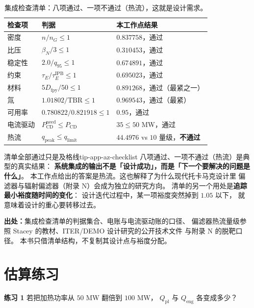 \begin{table}[htbp]
\centering
\small
\setlength{\tabcolsep}{4pt}
\caption{集成检查清单：八项通过、一项不通过（热流），这就是设计需求。}
\label{tab:app-az-checklist}
\begin{tabular}{p{4.0cm}p{3.6cm}p{3.8cm}}
\toprule
检查项 & 判据 & 本工作点结果 \\
\midrule
密度 & $n/n_G\le1$ & $0.837758$，通过 \\
比压 & $\beta_N/3\le1$ & $0.310453$，通过 \\
稳定性 & $2.0/q_{95}\le1$ & $0.674891$，通过 \\
约束 & $\tau_E/\tau_E^\mathrm{IPB}\le1$ & $0.695023$，通过 \\
材料 & $5D_\mathrm{fpy}/50\le1$ & $0.891268$，通过（最紧之一） \\
氚 & $1.01802/\mathrm{TBR}\le1$ & $0.969543$，通过（最紧） \\
可用率 & $0.780822/0.821918\le1$ & $0.95$，通过 \\
电流驱动 & $P_\mathrm{CD}^\mathrm{need}\le P_\mathrm{CD}$ & $35\le50$ MW，通过 \\
热流 & $q_\mathrm{peak}\le q_\mathrm{limit}$ & $44.4976$ vs $10$ 量级，\textbf{不通过} \\
\bottomrule
\end{tabular}

\end{table}

\begin{tip}{清单全部通过只是及格线}{tip-app-az-checklist}
八项通过、一项不通过（热流）是典型的真实结果：
\textbf{系统集成的输出不是「设计成功」，而是「下一个要解决的问题是什么」}。
本工作点给出的答案是热流。这也解释了为什么现代托卡马克设计里
偏滤器与辐射偏滤器（附录 N）会成为独立的研究方向。
清单的另一个用处是\textbf{追踪最小裕度随时间的变化}：
设计迭代过程中，某一项裕度突然掉到 $1.05$ 以下，
就意味着设计的重心要转移过去。
\end{tip}

{\footnotesize
\textbf{出处：}集成检查清单的判据集合、电账与电流驱动账的口径、
偏滤器热流量级参照 Stacey 的教材、ITER/DEMO 设计研究的公开技术文件
与附录 N 的脱靶口径。
本书只借清单结构，不复制其设计点与裕度分配。
}

\section{估算练习}
\label{sec:app-az-problems}

\textbf{练习 1} 若把加热功率从 $50$ MW 翻倍到 $100$ MW，
$Q_\mathrm{pl}$ 与 $Q_\mathrm{eng}$ 各变成多少？

